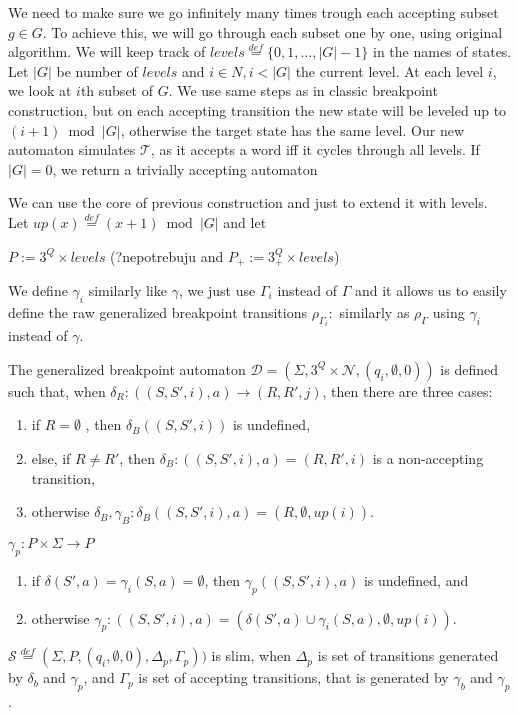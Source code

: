 \documentclass[
	digital
nolof, nolot
]{fithesis3}
\newcommand{\cD}{\mathcal{D}}
\newcommand{\cN}{\mathcal{N}}
\newcommand{\cS}{\mathcal{S}}
\newcommand{\cT}{\mathcal{T}}
\newcommand{\eqdef}{\overset{def}{=}}
\begin{document}
			We need to make sure we go infinitely many times trough each accepting subset $g \in G$.
			To achieve this, we will go through each subset one by one, using original algorithm. We will keep track of $levels\eqdef\{0,1,\ldots,|G|-1\}$ in the names of states. Let $|G|$ be number of $levels$ and $i \in N, i<|G|$ the current level. At each level $i$, we look at $i$th subset of $G$. We use same steps as in classic breakpoint construction, but on each accepting transition the new state will be leveled up to $(i+1)\bmod|G|$, otherwise the target state has the same level. Our new automaton simulates $\cT$, as it accepts a word iff it cycles through all levels. If $|G|=0$, we return a trivially accepting automaton
			
			We can use the core of previous construction and just to extend it with levels. Let
			$up(x)\eqdef(x+1)\bmod|G|$ and let 
			
			
			$P := 3^Q \times levels$ (?nepotrebuju and $P_+ := 3^Q_+ \times levels$)
			
			
			We define $\gamma_i$ similarly like $\gamma$, we just use $\Gamma_i$ instead of $\Gamma$ and it allows us to easily define the raw generalized breakpoint transitions
			$\rho_{\Gamma_{i}}\colon$ similarly as $\rho_\Gamma$ using $\gamma_i$ instead of $\gamma$.
			
			The generalized breakpoint automaton $\cD=(\Sigma, 3^Q\times\cN, ({q_i},\emptyset, 0))$ is defined such that, when $\delta_R\colon((S, S', i), a) \rightarrow (R, R', j)$, then there are three cases:
			\begin{enumerate}
				\item if $R=\emptyset$ , then $\delta_B((S,S',i))$ is undefined,
				\item else, if $R \neq R'$, then $\delta_B\colon((S,S',i),a) = (R,R',i)$ is a non-accepting transition,
				\item otherwise $\delta_B, \gamma_B \colon \delta_B((S,S',i),a) = (R, \emptyset, up(i))$.
			\end{enumerate}
		
		
				$\gamma_{p}: P \times \Sigma \rightarrow P$
			\begin{enumerate}
				\item if $\delta(S',a)=\gamma_{i}(S, a)=\emptyset$, then $ \gamma_{p}((S,S',i),a)$ is undefined, and
				\item otherwise $\gamma_p \colon ((S,S',i),a) = (\delta(S',a)\cup \gamma_{i}(S, a), \emptyset, up(i))$.
			\end{enumerate}
			$\cS\eqdef(\Sigma, P, (q_i,\emptyset,0), \Delta_p,\Gamma_p))$ is slim, when $\Delta_p$ is set of transitions generated by $\delta_b$ and $\gamma_p$, and $\Gamma_p$ is set of accepting transitions, that is generated by $\gamma_b$ and $\gamma_p$.
			
\end{document}
